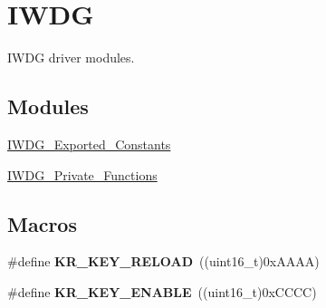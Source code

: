 \hypertarget{group___i_w_d_g}{\section{I\-W\-D\-G}
\label{group___i_w_d_g}
}


I\-W\-D\-G driver modules.  


\subsection*{Modules}
\begin{DoxyCompactItemize}
\item 
\hyperlink{group___i_w_d_g___exported___constants}{I\-W\-D\-G\-\_\-\-Exported\-\_\-\-Constants}
\item 
\hyperlink{group___i_w_d_g___private___functions}{I\-W\-D\-G\-\_\-\-Private\-\_\-\-Functions}
\end{DoxyCompactItemize}
\subsection*{Macros}
\begin{DoxyCompactItemize}
\item 
\hypertarget{group___i_w_d_g_ga830a9a1bad16c7043c86545f4c159a50}{\#define {\bfseries K\-R\-\_\-\-K\-E\-Y\-\_\-\-R\-E\-L\-O\-A\-D}~((uint16\-\_\-t)0x\-A\-A\-A\-A)}\label{group___i_w_d_g_ga830a9a1bad16c7043c86545f4c159a50}

\item 
\hypertarget{group___i_w_d_g_gaeaa0dd2da3f9d0cce0d708cfff1df545}{\#define {\bfseries K\-R\-\_\-\-K\-E\-Y\-\_\-\-E\-N\-A\-B\-L\-E}~((uint16\-\_\-t)0x\-C\-C\-C\-C)}\label{group___i_w_d_g_gaeaa0dd2da3f9d0cce0d708cfff1df545}

\end{DoxyCompactItemize}
